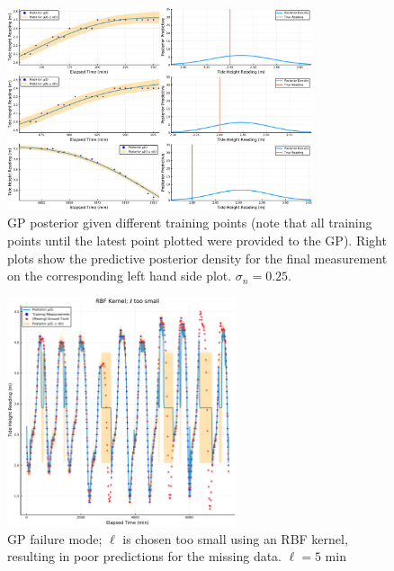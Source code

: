 \documentclass[a4paper, twocolumn, 10pt]{article}
\begin{document}
\begin{appendices}
\begin{figure}
	\includegraphics[width=0.8\textwidth]{goodcal}
	\centering
	\caption{\label{goodcal}GP posterior given different training points (note that all training points until the latest point plotted were provided to the GP). Right plots show the predictive posterior density for the final measurement on the corresponding left hand side plot. $\sigma_n = 0.25$. }
\end{figure}

\begin{figure}
	\includegraphics[width=0.6\textwidth]{badkernel1}
	\centering
	\caption{\label{l_too_small} GP failure mode; $\ell$ is chosen too small using an RBF kernel, resulting in poor predictions for the missing data. $\ell = 5 \text{ min}$}
\end{figure}


\end{appendices}
\end{document}
